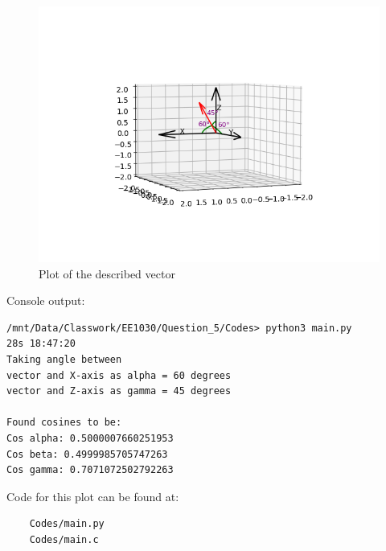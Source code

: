 \documentclass[journal]{IEEEtran}
\begin{document}
\newpage

\begin{figure}[H]
	\centering
	\includegraphics[width=0.75\columnwidth]{Figures/Figure.png}
	\caption{Plot of the described vector}
	\label{fig}
\end{figure}


Console output:
\begin{verbatim}
/mnt/Data/Classwork/EE1030/Question_5/Codes> python3 main.py                                                                                                       28s 18:47:20
Taking angle between 
vector and X-axis as alpha = 60 degrees
vector and Z-axis as gamma = 45 degrees

Found cosines to be:
Cos alpha: 0.5000007660251953
Cos beta: 0.4999985705747263
Cos gamma: 0.7071072502792263
\end{verbatim}

Code for this plot can be found at:
\begin{lstlisting}
    Codes/main.py
    Codes/main.c
\end{lstlisting}
\end{document}
